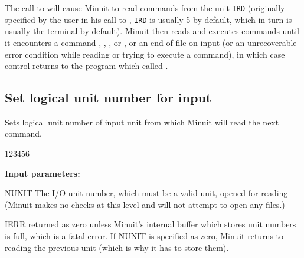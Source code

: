 The call to  will cause Minuit to read commands from
the unit \texttt{IRD} (originally specified by the user in his call to ,
\texttt{IRD} is usually 5 by default,
which in turn is usually the terminal by default).
Minuit then reads and executes commands until it encounters
a command , , , or , 
or an end-of-file on input
(or an unrecoverable error condition while reading
or trying to execute a command), in which case control returns
to the program which called .

\subsection{Set logical unit number for input}

Sets logical unit number of input unit from which Minuit will read
the next command.


\begin{DLtt}{123456}
\item[{\rm\bf Input parameters:}]
\item[NUNIT]   The I/O unit number, which must be a valid unit, opened
   for reading (Minuit makes no checks at this level and will not attempt
   to open any files.)  
\item[IERR]    returned as zero unless Minuit's internal buffer which 
          stores unit numbers is full, which is a fatal error.  If
          NUNIT is specified as zero, Minuit returns to reading the previous
          unit (which is why it has to store them).
\end{DLtt}
 
